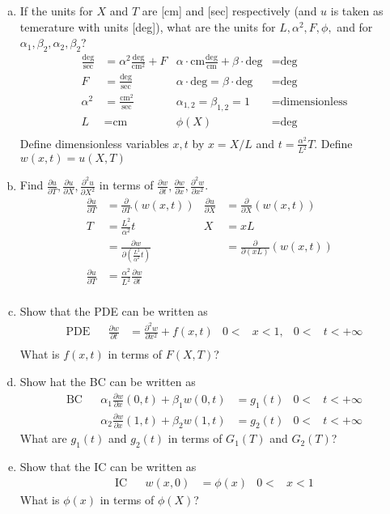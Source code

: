 \documentclass{article}
\begin{document}
\begin{enumerate}[(a)]
\item
If the units for $X$ and $T$ are [cm] and [sec] respectively (and $u$ is taken as temerature with units [deg]), what are the units for $L,\alpha^2,F,\phi,$ and for $\alpha_1,\beta_2,\alpha_2,\beta_2$?
\begin{align*}
  \frac{\text{deg}}{\text{sec}}&=\alpha^2\frac{\text{deg}}{\text{cm}^2}+F&\alpha\cdot\text{cm}\frac{\text{deg}}{\text{cm}}+\beta\cdot\text{deg}&=\text{deg}\\
  F&=\frac{\text{deg}}{\text{sec}}&\alpha\cdot\text{deg}=\beta\cdot\text{deg}&=\text{deg}\\
  \alpha^2&=\frac{\text{cm}^2}{\text{sec}}&\alpha_{1,2}=\beta_{1,2}=1&=\text{dimensionless}\\
  L&=\text{cm}&\phi(X)&=\text{deg}\\
\end{align*}
Define dimensionless variables $x,t$ by $x=X/L$ and $t=\frac{\alpha^2}{L^2}T$. Define $w(x,t)=u(X,T)$
\item
Find $\frac{\partial u}{\partial T},\frac{\partial u}{\partial X},\frac{\partial^2 u}{\partial X^2}$ in terms of $\frac{\partial w}{\partial t},\frac{\partial w}{\partial x},\frac{\partial^2 w}{\partial x^2}$.
\begin{align*}
  \frac{\partial u}{\partial T}&=\frac{\partial }{\partial T}\left(w(x,t)\right)&\frac{\partial u}{\partial X}&=\frac{\partial }{\partial X}(w(x,t))\\
  T&=\frac{L^2}{\alpha^2}t&X&=xL&\\
  &=\frac{\partial w}{\partial \left(\frac{L^2}{\alpha^2}t\right)}&&=\frac{\partial }{\partial (xL)}(w(x,t))\\
  \frac{\partial u}{\partial T}&=\frac{\alpha^2}{L^2}\frac{\partial w}{\partial t}\\
\end{align*}
\item
Show that the PDE can be written as
\begin{align*}
  \text{PDE}&&\frac{\partial w}{\partial t}&=\frac{\partial^2 w}{\partial x^2}+f(x,t)&0<&x<1,&0<&t<+\infty\\
\end{align*}
What is $f(x,t)$ in terms of $F(X,T)$?
\item
Show hat the BC can be written as
\begin{align*}
  \text{BC}&&\alpha_1\frac{\partial w}{\partial x}(0,t)+\beta_1w(0,t)&=g_1(t)&0<&t<+\infty\\
  &&\alpha_2\frac{\partial w}{\partial x}(1,t)+\beta_2w(1,t)&=g_2(t)&0<&t<+\infty
\end{align*}
What are $g_1(t)$ and $g_2(t)$ in terms of $G_1(T)$ and $G_2(T)$?
\item
Show that the IC can be written as
\begin{align*}
  \text{IC}&&w(x,0)&=\phi(x)&0<&x<1
\end{align*}
What is $\phi(x)$ in terms of $\phi(X)$?
\end{enumerate}
\end{document}
